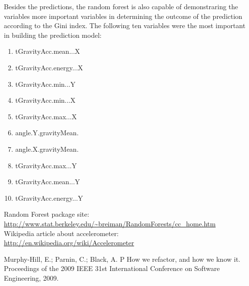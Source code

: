 \documentclass[IEEEtran]{IEEEtran}
\begin{document}
Besides the predictions, the random forest is also capable of demonstraring the
variables more important variables in determining the outcome of the prediction
according to the Gini index. The following ten variables were the most important
in building the prediction model:

\begin{enumerate}
    \item tGravityAcc.mean...X
    \item tGravityAcc.energy...X
    \item tGravityAcc.min...Y
    \item tGravityAcc.min...X
    \item tGravityAcc.max...X
    \item angle.Y.gravityMean.
    \item angle.X.gravityMean.
    \item tGravityAcc.max...Y
    \item tGravityAcc.mean...Y
    \item tGravityAcc.energy...Y
\end{enumerate}





\begin{thebibliography}{24}

 Random Forest package site: \url{http://www.stat.berkeley.edu/~breiman/RandomForests/cc_home.htm}
 Wikipedia article about accelerometer: \url{http://en.wikipedia.org/wiki/Accelerometer}

 Murphy-Hill, E.; Parnin, C.; Black, A. P  How we refactor, and how we know it. 
Proceedings of the 2009 IEEE 31st International Conference on Software Engineering, 2009.

\end{thebibliography}

\end{document}
